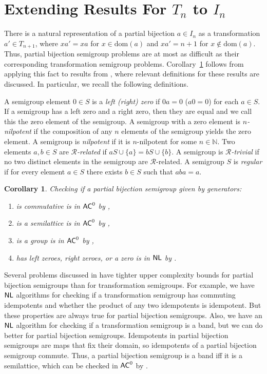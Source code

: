 \documentclass{amsart}
\newcommand{\dom}{\mathrm{dom}}
\newcommand{\NL}{\ensuremath\mathsf{NL}}
\newcommand{\AC}{\ensuremath\mathsf{AC}}
\newcommand{\gR}{\mathcal{R}}
\newtheorem{corollary}[theorem]{Corollary}
\theoremstyle{remark}
\numberwithin{equation}{section}
\begin{document}
\section{Extending Results For $T_n$ to $I_n$}
There is a natural representation of a partial bijection $a \in I_n$ as a transformation $a' \in T_{n+1}$, where $xa' = xa$ for $x \in \dom(a)$ and $xa' = n+1$ for $x \not \in \dom(a)$. Thus, partial bijection semigroup problems are at most as difficult as their corresponding transformation semigroup problems. Corollary~\ref{cor:red} follows from applying this fact to results from \cite{FJ:CP}, where relevant definitions for these results are discussed. In particular, we recall the following definitions.

A semigroup element $0 \in S$ is a \emph{left (right) zero} if $0a = 0$ ($a0 = 0$) for each $a \in S$. If a semigroup has a left zero and a right zero, then they are equal and we call this the zero element of the semigroup. A semigroup with a zero element is \emph{$n$-nilpotent} if the composition of any $n$ elements of the semigroup yields the zero element. A semigroup is \emph{nilpotent} if it is $n$-nilpotent for some $n \in \mathbb{N}$. Two elements $a,b \in S$ are \emph{$\gR$-related} if $aS \cup \{a\} = bS \cup \{b\}$. A semigroup is \emph{$\gR$-trivial} if no two distinct elements in the semigroup are $\gR$-related. A semigroup $S$ is \emph{regular} if for every element $a \in S$ there exists $b \in S$ such that $aba = a$.

\begin{corollary} \label{cor:red}
Checking if a partial bijection semigroup given by generators:
\begin{enumerate}
\item is commutative is in $\AC^0$ by \cite[Thm 3.2]{FJ:CP},
\item is a semilattice is in $\AC^0$ by  \cite[Thm 3.3]{FJ:CP},
\item is a group is in $\AC^0$ by  \cite[Thm 3.5]{FJ:CP},
\item has left zeroes, right zeroes, or a zero is in $\NL$ by \cite[Thm 4.6]{FJ:CP}.
\end{enumerate}
\end{corollary}

Several problems discussed in \cite{FJ:CP} have tighter upper complexity bounds for partial bijection semigroups than for transformation semigroups. For example, we have $\NL$ algorithms for checking if a transformation semigroup has commuting idempotents and whether the product of any two idempotents is idempotent. But these properties are always true for partial bijection semigroups. Also, we have an $\NL$ algorithm for checking if a transformation semigroup is a band, but we can do better for partial bijection semigroups. Idempotents in partial bijection semigroups are maps that fix their domain, so idempotents of a partial bijection semigroup commute. Thus, a partial bijection semigroup is a band iff it is a semilattice, which can be checked in $\AC^0$ by \cite[Thm 3.3]{FJ:CP}.
\end{document}
